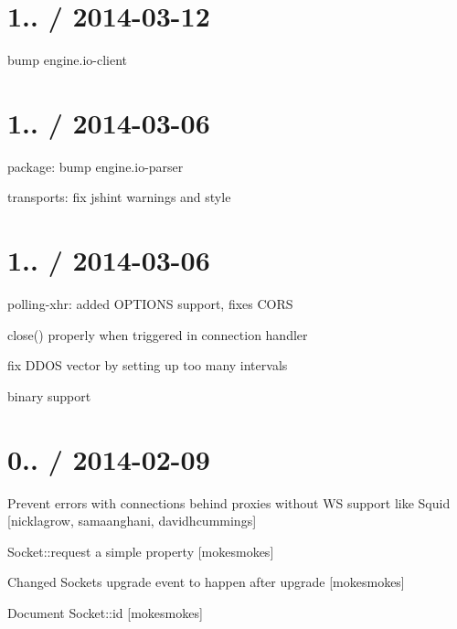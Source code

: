 \section*{1.. / 2014-\/03-\/12 }


\begin{DoxyItemize}
\item bump engine.\+io-\/client
\end{DoxyItemize}

\section*{1.. / 2014-\/03-\/06 }


\begin{DoxyItemize}
\item package\+: bump {\ttfamily engine.\+io-\/parser}
\item transports\+: fix jshint warnings and style
\end{DoxyItemize}

\section*{1.. / 2014-\/03-\/06 }


\begin{DoxyItemize}
\item polling-\/xhr\+: added {\ttfamily O\+P\+T\+I\+O\+NS} support, fixes C\+O\+RS
\item close() properly when triggered in connection handler
\item fix D\+D\+OS vector by setting up too many intervals
\item binary support
\end{DoxyItemize}

\section*{0.. / 2014-\/02-\/09 }


\begin{DoxyItemize}
\item Prevent errors with connections behind proxies without WS support like Squid \mbox{[}nicklagrow, samaanghani, davidhcummings\mbox{]}
\item Socket\+::request a simple property \mbox{[}mokesmokes\mbox{]}
\item Changed {\ttfamily Socket}\textquotesingle{}s {\ttfamily upgrade} event to happen after upgrade \mbox{[}mokesmokes\mbox{]}
\item Document {\ttfamily Socket\+::id} \mbox{[}mokesmokes\mbox{]}
\end{DoxyItemize}

